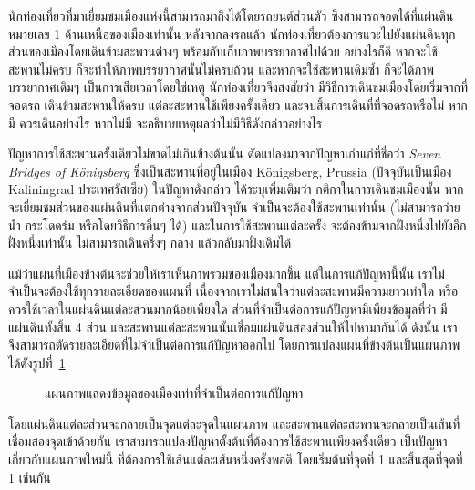 นักท่องเที่ยวที่มาเยี่ยมชมเมืองแห่งนี้สามารถมาถึงได้โดยรถยนต์ส่วนตัว ซึ่งสามารถจอดได้ที่แผ่นดินหมายเลข 1 ด้านเหนือของเมืองเท่านั้น \enskip หลังจากลงรถแล้ว นักท่องเที่ยวต้องการแวะไปยังแผ่นดินทุกส่วนของเมืองโดยเดินข้ามสะพานต่างๆ พร้อมกับเก็บภาพบรรยากาศไปด้วย \enskip อย่างไรก็ดี หากจะใช้สะพานไม่ครบ ก็จะทำให้ภาพบรรยากาศนั้นไม่ครบถ้วน และหากจะใช้สะพานเดิมซ้ำ ก็จะได้ภาพบรรยากาศเดิมๆ เป็นการเสียเวลาโดยใช่เหตุ \enskip นักท่องเที่ยวจึงสงสัยว่า มีวิธีการเดินชมเมืองโดยเริ่มจากที่จอดรถ เดินข้ามสะพานให้ครบ แต่ละสะพานใช้เพียงครั้งเดียว และจบสิ้นการเดินที่ที่จอดรถหรือไม่ \enskip หากมี ควรเดินอย่างไร \enskip หากไม่มี จะอธิบายเหตุผลว่าไม่มีวิธีดังกล่าวอย่างไร

ปัญหาการใช้สะพานครั้งเดียวไม่ขาดไม่เกินข้างต้นนั้น ดัดแปลงมาจากปัญหาเก่าแก่ที่ชื่อว่า \emph{Seven Bridges of Königsberg} ซึ่งเป็นสะพานที่อยู่ในเมือง Königsberg, Prussia (ปัจจุบันเป็นเมือง Kaliningrad ประเทศรัสเซีย) \enskip ในปัญหาดังกล่าว ได้ระบุเพิ่มเติมว่า กติกาในการเดินชมเมืองนั้น หากจะเยี่ยมชมส่วนของแผ่นดินที่แตกต่างจากส่วนปัจจุบัน จำเป็นจะต้องใช้สะพานเท่านั้น (ไม่สามารถว่ายน้ำ กระโดดร่ม หรือโดยวิธีการอื่นๆ ได้) และในการใช้สะพานแต่ละครั้ง จะต้องข้ามจากฝั่งหนึ่งไปยังอีกฝั่งหนึ่งเท่านั้น ไม่สามารถเดินครึ่งๆ กลาง แล้วกลับมาฝั่งเดิมได้

แม้ว่าแผนที่เมืองข้างต้นจะช่วยให้เราเห็นภาพรวมของเมืองมากขึ้น แต่ในการแก้ปัญหานี้นั้น เราไม่จำเป็นจะต้องใช้ทุกรายละเอียดของแผนที่ เนื่องจากเราไม่สนใจว่าแต่ละสะพานมีความยาวเท่าใด หรือควรใช้เวลาในแผ่นดินแต่ละส่วนมากน้อยเพียงใด \enskip ส่วนที่จำเป็นต่อการแก้ปัญหามีเพียงข้อมูลที่ว่า มีแผ่นดินทั้งสิ้น 4 ส่วน และสะพานแต่ละสะพานนั้นเชื่อมแผ่นดินสองส่วนให้ไปหามากันได้ \enskip ดังนั้น เราจึงสามารถตัดรายละเอียดที่ไม่จำเป็นต่อการแก้ปัญหาออกไป โดยการแปลงแผนที่ข้างต้นเป็นแผนภาพได้ดังรูปที่~\ref{fig:map-graph}
%
\begin{figure}
\centering
{}
\caption{แผนภาพแสดงข้อมูลของเมืองเท่าที่จำเป็นต่อการแก้ปัญหา}
\label{fig:map-graph}
\end{figure}
%
โดยแผ่นดินแต่ละส่วนจะกลายเป็นจุดแต่ละจุดในแผนภาพ และสะพานแต่ละสะพานจะกลายเป็นเส้นที่เชื่อมสองจุดเข้าด้วยกัน \enskip เราสามารถแปลงปัญหาตั้งต้นที่ต้องการใช้สะพานเพียงครั้งเดียว เป็นปัญหาเกี่ยวกับแผนภาพใหม่นี้ ที่ต้องการใช้เส้นแต่ละเส้นหนึ่งครั้งพอดี โดยเริ่มต้นที่จุดที่ 1 และสิ้นสุดที่จุดที่ 1 เช่นกัน

